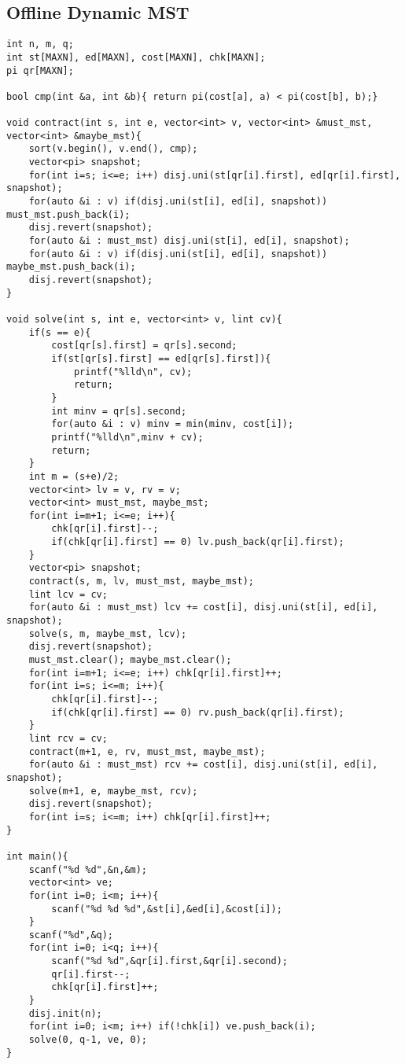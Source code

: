 \documentclass[landscape, 8pt, a4paper, oneside,  twocolumn]{extarticle}
\begin{document}
\subsection{Offline Dynamic MST}
\begin{verbatim}
int n, m, q;
int st[MAXN], ed[MAXN], cost[MAXN], chk[MAXN];
pi qr[MAXN];

bool cmp(int &a, int &b){ return pi(cost[a], a) < pi(cost[b], b);}

void contract(int s, int e, vector<int> v, vector<int> &must_mst, vector<int> &maybe_mst){
	sort(v.begin(), v.end(), cmp);
	vector<pi> snapshot;
	for(int i=s; i<=e; i++) disj.uni(st[qr[i].first], ed[qr[i].first], snapshot);
	for(auto &i : v) if(disj.uni(st[i], ed[i], snapshot)) must_mst.push_back(i);
	disj.revert(snapshot);
	for(auto &i : must_mst) disj.uni(st[i], ed[i], snapshot);
	for(auto &i : v) if(disj.uni(st[i], ed[i], snapshot)) maybe_mst.push_back(i);
	disj.revert(snapshot);
}

void solve(int s, int e, vector<int> v, lint cv){
	if(s == e){
		cost[qr[s].first] = qr[s].second;
		if(st[qr[s].first] == ed[qr[s].first]){
			printf("%lld\n", cv);
			return;
		}
		int minv = qr[s].second;
		for(auto &i : v) minv = min(minv, cost[i]);
		printf("%lld\n",minv + cv);
		return;
	}
	int m = (s+e)/2;
	vector<int> lv = v, rv = v;
	vector<int> must_mst, maybe_mst;
	for(int i=m+1; i<=e; i++){
		chk[qr[i].first]--;
		if(chk[qr[i].first] == 0) lv.push_back(qr[i].first);
	}
	vector<pi> snapshot;
	contract(s, m, lv, must_mst, maybe_mst);
	lint lcv = cv;
	for(auto &i : must_mst) lcv += cost[i], disj.uni(st[i], ed[i], snapshot);
	solve(s, m, maybe_mst, lcv);
	disj.revert(snapshot);
	must_mst.clear(); maybe_mst.clear();
	for(int i=m+1; i<=e; i++) chk[qr[i].first]++;
	for(int i=s; i<=m; i++){
		chk[qr[i].first]--;
		if(chk[qr[i].first] == 0) rv.push_back(qr[i].first);
	}
	lint rcv = cv;
	contract(m+1, e, rv, must_mst, maybe_mst);
	for(auto &i : must_mst) rcv += cost[i], disj.uni(st[i], ed[i], snapshot);
	solve(m+1, e, maybe_mst, rcv);
	disj.revert(snapshot);
	for(int i=s; i<=m; i++) chk[qr[i].first]++;
}

int main(){
	scanf("%d %d",&n,&m);
	vector<int> ve;
	for(int i=0; i<m; i++){
		scanf("%d %d %d",&st[i],&ed[i],&cost[i]);
	}
	scanf("%d",&q);
	for(int i=0; i<q; i++){
		scanf("%d %d",&qr[i].first,&qr[i].second);
		qr[i].first--;
		chk[qr[i].first]++;
	}
	disj.init(n);
	for(int i=0; i<m; i++) if(!chk[i]) ve.push_back(i);
	solve(0, q-1, ve, 0);
}
\end{verbatim}
\end{document}
